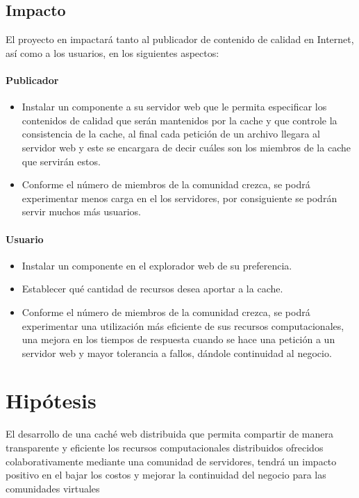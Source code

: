 \subsection{Impacto}


El proyecto en impactará tanto al publicador de contenido de calidad en Internet, así como a los usuarios, en los siguientes aspectos:

\paragraph{Publicador}


\begin{itemize}
\item Instalar un componente a su servidor web que le permita especificar los contenidos de calidad que serán mantenidos por la cache y que controle la consistencia de la cache, al final cada petición de un archivo llegara al servidor web y este se encargara de decir cuáles son los miembros de la cache que servirán estos.
\item Conforme el número de miembros de la comunidad crezca, se podrá experimentar menos carga en el los servidores, por consiguiente se podrán servir muchos más usuarios.
\end{itemize}
 

\paragraph{Usuario}
\begin{itemize}
\item Instalar un componente en el  explorador web de su preferencia.
\item Establecer qué cantidad de recursos desea aportar a la cache.
\item Conforme el número de miembros de la comunidad crezca, se podrá experimentar una utilización más eficiente de sus recursos computacionales, una mejora en los tiempos de respuesta cuando se hace una petición a un servidor web y mayor tolerancia a fallos, dándole continuidad al negocio. 
\end{itemize}


\section{Hipótesis}
El desarrollo de una caché web distribuida que permita compartir de manera transparente y eficiente los recursos computacionales distribuidos ofrecidos colaborativamente mediante una comunidad de servidores, tendrá un impacto positivo en el bajar los costos y mejorar la continuidad del negocio para las comunidades virtuales 

